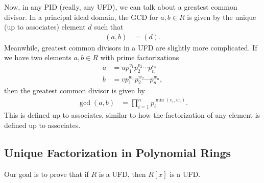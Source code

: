 \documentclass[10pt]{mypackage}
\begin{document}
Now, in any PID (really, any UFD), we can talk about a greatest common divisor. In a principal ideal domain, the GCD for $a,b\in R$ is given by the unique (up to associates) element $d$ such that
\begin{align*}
  \left( a,b \right) &= \left( d \right).
\end{align*}
Meanwhile, greatest common divisors in a UFD are slightly more complicated. If we have two elements $a,b\in R$ with prime factorizations
\begin{align*}
  a &= up_1^{v_1}p_2^{v_2}\cdots p_n^{v_n}\\
  b &= vp_1^{w_1}p_2^{w_2}\cdots p_n^{w_n},
\end{align*}
then the greatest common divisor is given by
\begin{align*}
  \gcd\left( a,b \right) &= \prod_{i=1}^{n} p_i^{\operatorname{min}\left( v_i,w_i \right)}.
\end{align*}
This is defined up to associates, similar to how the factorization of any element is defined up to associates.
\subsection{Unique Factorization in Polynomial Rings}%
Our goal is to prove that if $R$ is a UFD, then $R[x]$ is a UFD.\newline
\end{document}
